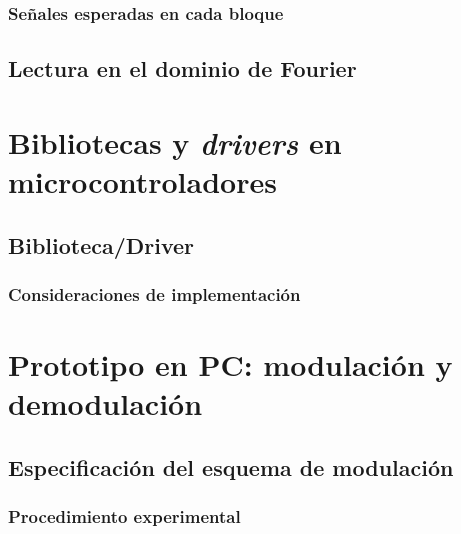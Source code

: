 \documentclass[letter,12pt]{article}
\begin{document}
\subsubsection{Señales esperadas en cada bloque}
\subsection{Lectura en el dominio de Fourier}

\section{Bibliotecas y \emph{drivers} en microcontroladores}
\subsection{Biblioteca/Driver}

\subsubsection{Consideraciones de implementación}

\section{Prototipo en PC: modulación y demodulación}
\subsection{Especificación del esquema de modulación}
\subsubsection{Procedimiento experimental}
\end{document}
